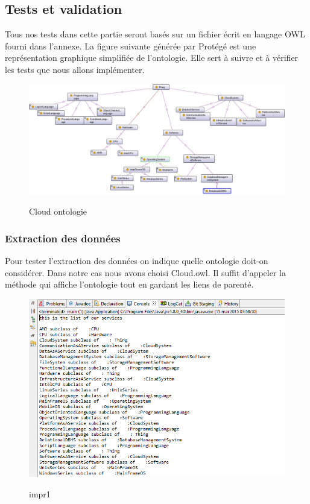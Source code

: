     \subsection{Tests et validation}
        Tous nos tests dans cette partie seront basés sur un fichier écrit en langage OWL fourni dans l'annexe. La figure suivante générée par Protégé est une représentation graphique simplifiée de l'ontologie. Elle sert à suivre et à vérifier les tests que nous allons implémenter.\\
        \begin{figure}[H]
                    \centering
                    \includegraphics[width=15cm]{cloudle_ontologie}\\
                    \caption{Cloud ontologie}\label{cloud ontologie}
        \end{figure}

        \subsubsection{Extraction des données}
                        Pour tester l'extraction des données on indique quelle ontologie doit-on considérer. Dans notre cas nous avons choisi Cloud.owl. Il suffit d'appeler la méthode qui affiche l'ontologie tout en gardant les liens de parenté.\\
            \begin{figure}[H]
                    \centering
                    \includegraphics[width=14cm]{imprime_concepts}\\
                    \caption{impr1}\label{impr1}
        \end{figure}
